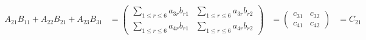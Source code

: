 \documentclass{article}
\begin{document}
\begin{enumerate}
    \begin{align*}
      A_{21} B_{11} + A_{22} B_{21} + A_{23} B_{31}
      &= \begin{pmatrix}
        \sum_{1 \le r \le 6} a_{3r} b_{r1} & \sum_{1 \le r \le 6} a_{3r} b_{r2} \\
        \sum_{1 \le r \le 6} a_{4r} b_{r1} & \sum_{1 \le r \le 6} a_{4r} b_{r2}
      \end{pmatrix} 
      &= \begin{pmatrix}
        c_{31} & c_{32} \\
        c_{41} & c_{42}
      \end{pmatrix}
      &= C_{21}
    \end{align*}
\end{enumerate}
\end{document}
